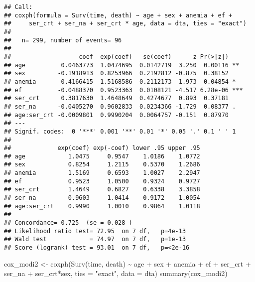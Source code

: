 \documentclass[
]{article}
\newenvironment{Shaded}{\begin{snugshade}}{\end{snugshade}}
\newcommand{\AttributeTok}[1]{\textcolor[rgb]{0.77,0.63,0.00}{#1}}
\newcommand{\FunctionTok}[1]{\textcolor[rgb]{0.00,0.00,0.00}{#1}}
\newcommand{\NormalTok}[1]{#1}
\newcommand{\OtherTok}[1]{\textcolor[rgb]{0.56,0.35,0.01}{#1}}
\newcommand{\SpecialCharTok}[1]{\textcolor[rgb]{0.00,0.00,0.00}{#1}}
\newcommand{\StringTok}[1]{\textcolor[rgb]{0.31,0.60,0.02}{#1}}
\begin{document}
\begin{verbatim}
## Call:
## coxph(formula = Surv(time, death) ~ age + sex + anemia + ef + 
##     ser_crt + ser_na + ser_crt * age, data = dta, ties = "exact")
## 
##   n= 299, number of events= 96 
## 
##                   coef  exp(coef)   se(coef)      z Pr(>|z|)    
## age          0.0463773  1.0474695  0.0142719  3.250  0.00116 ** 
## sex         -0.1918913  0.8253966  0.2192812 -0.875  0.38152    
## anemia       0.4166415  1.5168586  0.2112173  1.973  0.04854 *  
## ef          -0.0488370  0.9523363  0.0108121 -4.517 6.28e-06 ***
## ser_crt      0.3817630  1.4648649  0.4274677  0.893  0.37181    
## ser_na      -0.0405270  0.9602833  0.0234366 -1.729  0.08377 .  
## age:ser_crt -0.0009801  0.9990204  0.0064757 -0.151  0.87970    
## ---
## Signif. codes:  0 '***' 0.001 '**' 0.01 '*' 0.05 '.' 0.1 ' ' 1
## 
##             exp(coef) exp(-coef) lower .95 upper .95
## age            1.0475     0.9547    1.0186    1.0772
## sex            0.8254     1.2115    0.5370    1.2686
## anemia         1.5169     0.6593    1.0027    2.2947
## ef             0.9523     1.0500    0.9324    0.9727
## ser_crt        1.4649     0.6827    0.6338    3.3858
## ser_na         0.9603     1.0414    0.9172    1.0054
## age:ser_crt    0.9990     1.0010    0.9864    1.0118
## 
## Concordance= 0.725  (se = 0.028 )
## Likelihood ratio test= 72.95  on 7 df,   p=4e-13
## Wald test            = 74.97  on 7 df,   p=1e-13
## Score (logrank) test = 93.01  on 7 df,   p=<2e-16
\end{verbatim}

\begin{Shaded}
\begin{Highlighting}[]
\NormalTok{cox\_modi2 }\OtherTok{\textless{}{-}} \FunctionTok{coxph}\NormalTok{(}\FunctionTok{Surv}\NormalTok{(time, death) }\SpecialCharTok{\textasciitilde{}}\NormalTok{ age  }\SpecialCharTok{+}\NormalTok{ sex }\SpecialCharTok{+}\NormalTok{ anemia }\SpecialCharTok{+}\NormalTok{ ef }\SpecialCharTok{+}\NormalTok{ ser\_crt }\SpecialCharTok{+}\NormalTok{ ser\_na }\SpecialCharTok{+}\NormalTok{ ser\_crt}\SpecialCharTok{*}\NormalTok{sex, }\AttributeTok{ties =} \StringTok{"exact"}\NormalTok{, }\AttributeTok{data =}\NormalTok{ dta)}
\FunctionTok{summary}\NormalTok{(cox\_modi2)}
\end{Highlighting}
\end{Shaded}
\end{document}
